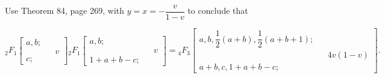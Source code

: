 \begin{problem}\label{problem8chapter16}
Use Theorem 84, page 269, with $y=x=-\dfrac{v}{1-v}$ to conclude that

$${}_2F_1 \left[ \begin{array}{rlr}
a,b; & & \\
& & v\\
c; & &
\end{array} \right] {}_2F_1 \left[ \begin{array}{rlr}
a,b; & & \\
& & v \\
1+a+b-c; & &
\end{array} \right] = {}_4F_3 \left[ \begin{array}{rlr}
a,b,\dfrac{1}{2}(a+b),\dfrac{1}{2}(a+b+1); & & \\
& & 4v(1-v) \\
a+b,c,1+a+b-c; & & 
\end{array} \right].$$
\end{problem}
